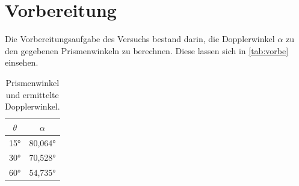 \section{Vorbereitung}
\label{sec:Vorbereitung}

Die Vorbereitungsaufgabe des Versuchs bestand darin, die Dopplerwinkel $\alpha$ zu den gegebenen 
Prismenwinkeln zu berechnen. Diese lassen sich in \autoref{tab:vorbe} einsehen.

\begin{table}
    \centering
    \caption{Prismenwinkel und ermittelte Dopplerwinkel.}
    \begin{tabular}{cc}
        \toprule
        {$\theta$} & {$\alpha$}\\
        \midrule
        15° & 80,064°\\
        30° & 70,528°\\
        60° & 54,735°\\
        \bottomrule
    \end{tabular}
    \label{tab:vorbe}
\end{table}

